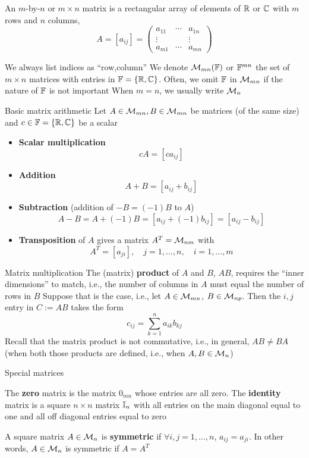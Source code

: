 \documentclass[aspectratio=169]{beamer}\usepackage[]{graphicx}\usepackage[]{xcolor}
\begin{document}
\begin{frame}
	\begin{definition}[Matrix]
		An $m$-by-$n$ or $m\times n$ matrix is a rectangular array of elements of $\mathbb{R}$ or $\mathbb{C}$ with $m$ rows and $n$ columns,
		\[
		A=[a_{ij}]=
		\begin{pmatrix}
		a_{11} & \cdots & a_{1n} \\
		\vdots & & \vdots \\
		a_{m1} & \cdots & a_{mn}
		\end{pmatrix}
		\]
	\end{definition}
	\vfill
	We always list indices as ``row,column''
	\vfill
	We denote $\mathcal{M}_{mn}(\mathbb{F})$ or $\mathbb{F}^{mn}$ the set of $m\times n$ matrices with entries in $\mathbb{F}=\{\mathbb{R},\mathbb{C}\}$. Often, we omit $\mathbb{F}$ in $\mathcal{M}_{mn}$ if the nature of $\mathbb{F}$ is not important
	\vfill
	When $m=n$, we usually write $\mathcal{M}_n$
\end{frame}

\begin{frame}{Basic matrix arithmetic}
Let $A\in\mathcal{M}_{mn},B\in\mathcal{M}_{mn}$ be matrices (of the same size) and $c\in\mathbb{F}=\{\mathbb{R},\mathbb{C}\}$ be a scalar
\begin{itemize}
	\item \textbf{Scalar multiplication}
	\[
	cA = [ca_{ij}]
	\]
	\item \textbf{Addition}
	\[
	A+B = [a_{ij}+b_{ij}]
	\]
	\item \textbf{Subtraction} (addition of $-B=(-1)B$ to $A$)
	\[
	A-B=A+(-1)B=[a_{ij}+(-1)b_{ij}]=[a_{ij}-b_{ij}]
	\]
	\item \textbf{Transposition} of $A$ gives a matrix $A^T=\mathcal{M}_{nm}$ with
	\[
	A^T=[a_{ji}],\quad j=1,\ldots,n,\quad i=1,\ldots,m
	\]
\end{itemize}
\end{frame}

\begin{frame}{Matrix multiplication}
The (matrix) \textbf{product} of $A$ and $B$, $AB$, requires the ``inner dimensions'' to match, i.e., the number of columns in $A$ must equal the number of rows in $B$
\vfill
Suppose that is the case, i.e., let $A\in\mathcal{M}_{mn}$, $B\in\mathcal{M}_{np}$. Then the $i,j$ entry in $C:=AB$ takes the form
\[
c_{ij} = \sum_{k=1}^n a_{ik}b_{kj}
\]
\vfill
Recall that the matrix product is not commutative, i.e., in general, $AB\neq BA$ (when both those products are defined, i.e., when $A,B\in\mathcal{M}_n$)
\end{frame}

\begin{frame}{Special matrices}
\begin{definition}
The \textbf{zero} matrix is the matrix $0_{mn}$ whose entries are all zero.
The \textbf{identity} matrix is a square $n\times n$ matrix $\mathbb{I}_n$ with all entries on the main diagonal equal to one and all off diagonal entries equal to zero
\end{definition}
\vfill
\begin{definition}
A square matrix $A\in\mathcal{M}_n$ is \textbf{symmetric} if $\forall i,j=1,\ldots,n$, $a_{ij}=a_{ji}$. In other words, $A\in\mathcal{M}_n$ is symmetric if $A=A^T$
\end{definition}
\end{frame}
\end{document}
